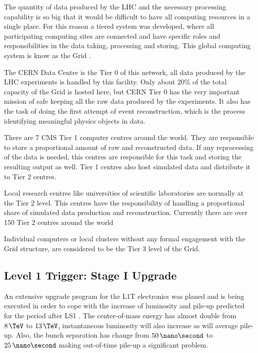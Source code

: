 
The quantity of data produced by the \gls{LHC} and the necessary processing capability is so big that it would be difficult to have all computing resources in a single place. For this reason a tiered system was developed, where all participating computing sites are connected and have specific roles and responsibilities in the data taking, processing and storing. This global computing system is know as the Grid \cite{CMSTDR:CMSComputing}.

The \gls{CERN} Data Centre is the Tier 0 of this network, all data produced by the \gls{LHC} experiments is handled by this facility. Only about 20\% of the total capacity of the Grid is hosted here, but \gls{CERN} Tier 0 has the very important mission of safe keeping all the raw data produced by the experiments. It also has the task of doing the first attempt of event reconstruction, which is the process identifying meaningful physics objects in data.

There are 7 \gls{CMS} Tier 1 computer centres around the world. They are responsible to store a proportional amount of raw and reconstructed data. If any reprocessing of the data is needed, this centres are responsible for this task and storing the resulting output as well. Tier 1 centres also host simulated data and distribute it to Tier 2 centres. 

Local research centres like universities of scientific laboratories are normally at the Tier 2 level. This centres have the responsibility of handling a proportional share of simulated data production and reconstruction. Currently there are over 150 Tier 2 centres around the world

Individual computers or local clusters without any formal engagement with the Grid structure, are considered to be the Tier 3 level of the Grid. 

\subsection{Level 1 Trigger: Stage I Upgrade}
\label{SUBSECTION:ExperimentalApparatus_CMS_L1TStage1}


An extensive upgrade program for the \gls{L1T} electronics was planed and is being executed in order to cope with the increase of luminosity and pile-up predicted for the period after \gls{LS1} \cite{CMSTDR:CMSL1Upgrade,CMSTDR:CMSUpgradeTDR}. The center-of-mass energy has almost double from $8\,\TeV$ to $13\,\TeV$, instantaneous luminosity will also increase as will average pile-up. Also, the bunch separation has change from $50\,\nano\second$ to $25\,\nano\second$ making out-of-time pile-up a significant problem. 


